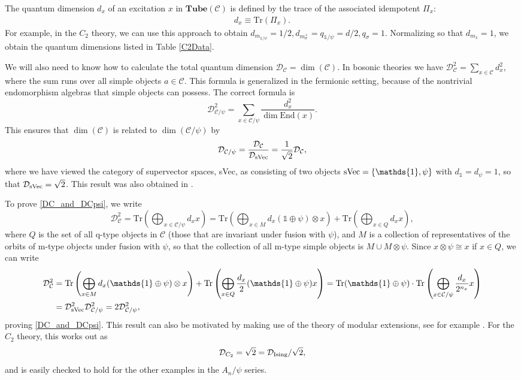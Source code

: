 \documentclass[12pt,a4paper]{article}
\newcommand{\tp}{\otimes}
\newcommand{\unit}{\mathds{1}}
\newcommand{\mcd}{\mathcal{D}}
\newcommand{\mcc}{\mathcal{C}}
\newcommand\be            {\begin{equation}}
\newcommand\ee            {\end{equation}}
\newcommand{\End}{\text{End}}
\newcommand{\tube}{\textbf{Tube}}
\begin{document}
The quantum dimension $d_x$ of an excitation $x$ in $\tube(\mcc)$ is defined by the trace of the associated idempotent $\Pi_x$: 
\begin{align}
d_x \equiv \text{Tr} (\Pi_x).
\end{align}
For example, in the $C_2$ theory, we can use this approach to obtain $d_{m_{\unit / \psi}} = 1/2, d_{m_\sigma^+} = q_{\unit/\psi} = d/2, q_\sigma = 1$. 
Normalizing so that $d_{m_\unit} = 1$, we obtain the quantum dimensions listed in Table \ref{C2Data}. 

We will also need to know how to calculate the total quantum dimension $\mcd_\mcc = \dim(\mcc)$.
In bosonic theories we have $\mcd_\mcc^2 = \sum_{x\in \mcc} d_x^2$, where the sum runs over all simple objects $a\in\mcc$. 
This formula is generalized in the fermionic setting, because of the nontrivial endomorphism algebras that simple objects can possess.  
The correct formula is
\be \label{total_qdim_defn} \mcd_{\mcc/\psi}^2 = \sum_{x\in \mcc/\psi} \frac{d_x^2}{\dim \End(x)}.\ee
This ensures that $\dim(\mcc)$ is related to $\dim(\mcc / \psi)$ by 
\be \label{DC_and_DCpsi} \mcd_{\mcc / \psi} = \frac{\mcd_\mcc}{\mcd_{\rm sVec}} = \frac{1}{\sqrt{2}} \mcd_\mcc,\ee
where we have viewed the category of supervector spaces, sVec, as consisting of two objects 
${\rm sVec} = \{\unit,\psi\}$ with $d_\unit=d_\psi=1$, so that $\mcd_{\rm sVec} = \sqrt{2}$. 
This result was also obtained in \cite{wan2016}. 

To prove \eqref{DC_and_DCpsi}, we write 
\be
\mcd_\mcc^2 = \text{Tr} \left(\bigoplus_{x\in \mcc/\psi} d_x x\right) = \text{Tr} \left( \bigoplus_{x \in M} d_x (\mathds{1} \oplus \psi) \tp x \right ) + \text{Tr} \left(\bigoplus_{x  \in Q} {d_x} x \right),\ee
where $Q$ is the set of all q-type objects in $\mcc$ (those that are invariant under fusion with $\psi$), 
and $M$ is a collection of representatives of the orbits of m-type objects under fusion with $\psi$, so that 
the collection of all m-type simple objects is $M\cup M\tp \psi$.   
Since $x\tp \psi \cong x$ if $x\in Q$, we can write
\begin{align}
\mcd_\mcc^2 & = \text{Tr} \left( \bigoplus_{x \in M} d_x (\mathds{1} \oplus \psi) \tp x \right ) + 
\text{Tr}  \left(\bigoplus_{x  \in Q}\frac{d_x}{2}(\unit \oplus \psi) x \right) = \text{Tr}(\unit \oplus \psi) 
\cdot \text{Tr} \left( \bigoplus_{x \in \mcc/\psi} \frac{d_x}{2^{n_x}} x \right) \\ & = \mcd^2_{\rm sVec} 
\mcd_{\mcc/\psi}^2 = 2 \mcd_{\mcc/\psi}^2,
\end{align}
proving \eqref{DC_and_DCpsi}. 
This result can also be motivated by making use of the theory of modular extensions, see for example \cite{lan2016}. 
For the $C_2$ theory, this works out as 
\be \mcd_{C_2} = \sqrt{2} = \mcd_{\rm Ising} / \sqrt{2},\ee
and is easily checked to hold for the other examples in the $A_n / \psi$ series.  
\end{document}
